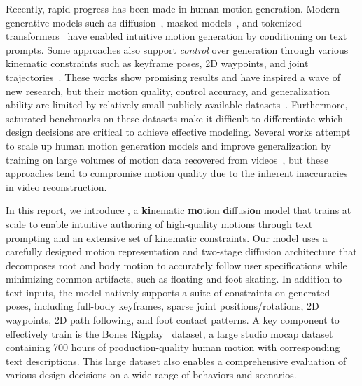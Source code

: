 Recently, rapid progress has been made in human motion generation. 
Modern generative models such as diffusion~\cite{tevet2023mdm,zhang2024motiondiffuse}, masked models~\cite{guo2024momask}, and tokenized transformers~\cite{zhang2023generating} have enabled intuitive motion generation by conditioning on text prompts.
Some approaches also support \emph{control} over generation through various kinematic constraints such as keyframe poses, 2D waypoints, and joint trajectories~\cite{guo2024momask, karunratanakul2023gmd, xie2024omnicontrol, cohan2024condmdi}.
These works show promising results and have inspired a wave of new research, but their motion quality, control accuracy, and generalization ability are limited by relatively small publicly available datasets~\cite{guo2022humanml3d,Plappert2016}. Furthermore, saturated benchmarks on these datasets make it difficult to differentiate which design decisions are critical to achieve effective modeling.
Several works attempt to scale up human motion generation models and improve generalization by training on large volumes of motion data recovered from videos~\cite{hymotion2025,wang2025scaling,lu2025scamo,lin2023motion}, but these approaches tend to compromise motion quality due to the inherent inaccuracies in video reconstruction.

In this report, we introduce \textbf{\model}, a \textbf{ki}nematic \textbf{mo}tion \textbf{d}iffusi\textbf{o}n model that 
trains at scale to enable intuitive authoring of high-quality motions through text prompting and an extensive set of kinematic constraints. 
Our model uses a carefully designed motion representation and two-stage diffusion architecture that decomposes root and body motion to accurately follow user specifications while minimizing common artifacts, such as floating and foot skating.
In addition to text inputs, the model natively supports a suite of constraints on generated poses, including full-body keyframes, sparse joint positions/rotations, 2D waypoints, 2D path following, and foot contact patterns.  
A key component to effectively train \model is the Bones Rigplay~\cite{bones_ai_datasets} dataset, a large studio mocap dataset containing 700 hours of production-quality human motion with corresponding text descriptions. This large dataset also enables a comprehensive evaluation of various design decisions on a wide range of behaviors and scenarios.

